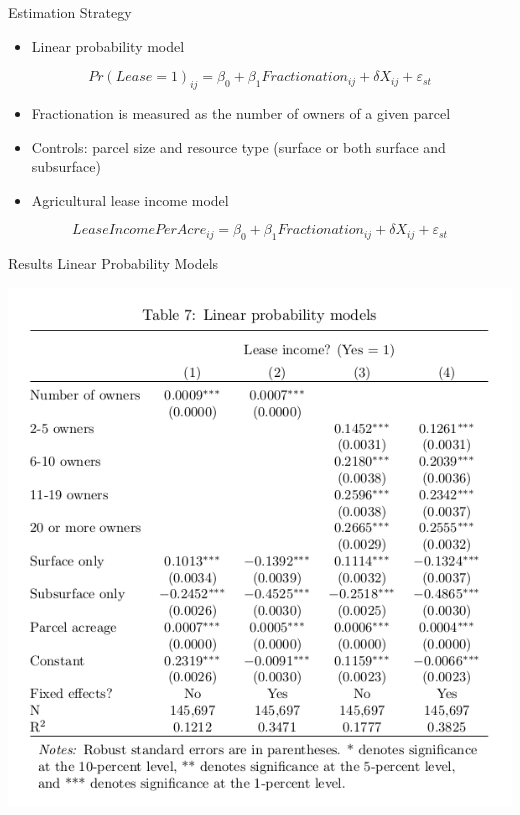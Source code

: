 \documentclass[ignorenonframetext,]{beamer}
\begin{document}
\begin{frame}{Estimation Strategy}

\begin{itemize}
\itemsep1pt\parskip0pt
\item
  Linear probability model
\end{itemize}

\[ Pr(Lease = 1)_{ij} = \beta_{0} + \beta_{1}Fractionation_{ij} + \delta X_{ij} 
+ \varepsilon _{st} \]

\begin{itemize}
\item
  Fractionation is measured as the number of owners of a given parcel\\
\item
  Controls: parcel size and resource type (surface or both surface and
  subsurface)
\item
  Agricultural lease income model
\end{itemize}

\[ LeaseIncomePerAcre_{ij} = \beta_{0} + \beta_{1}Fractionation_{ij} + \delta X_{ij} 
+ \varepsilon _{st} \]

\end{frame}

\begin{frame}{Results Linear Probability Models}

\centering
\includegraphics{Table7.png}

\end{frame}
\end{document}
